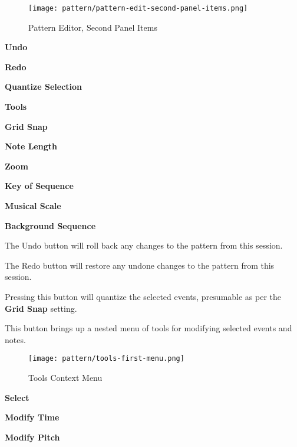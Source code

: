 \begin{figure}[H]
   \centering 
   \texttt{[image: pattern/pattern-edit-second-panel-items.png]}
   \caption{Pattern Editor, Second Panel Items}
   \label{fig:pattern_editor_main_panel_items}
\end{figure}

   \begin{enumber}
      \item \textbf{Undo}
      \item \textbf{Redo}
      \item \textbf{Quantize Selection}
      \item \textbf{Tools}
      \item \textbf{Grid Snap}
      \item \textbf{Note Length}
      \item \textbf{Zoom}
      \item \textbf{Key of Sequence}
      \item \textbf{Musical Scale}
      \item \textbf{Background Sequence}
   \end{enumber}

   \setcounter{ItemCounter}{0}      %

   The Undo button will roll back any changes to the pattern from this session.

   The Redo button will restore any undone changes to the pattern from this
   session.

   Pressing this button will quantize the selected events, presumable as per
   the \textbf{Grid Snap} setting.

   This button brings up a nested menu of tools for modifying selected
   events and notes.

\begin{figure}[H]
   \centering 
   \texttt{[image: pattern/tools-first-menu.png]}
   \caption{Tools Context Menu}
   \label{fig:pattern_editor_tools_first_menu}
\end{figure}

   \begin{enumber}
      \item \textbf{Select}
      \item \textbf{Modify Time}
      \item \textbf{Modify Pitch}
   \end{enumber}

